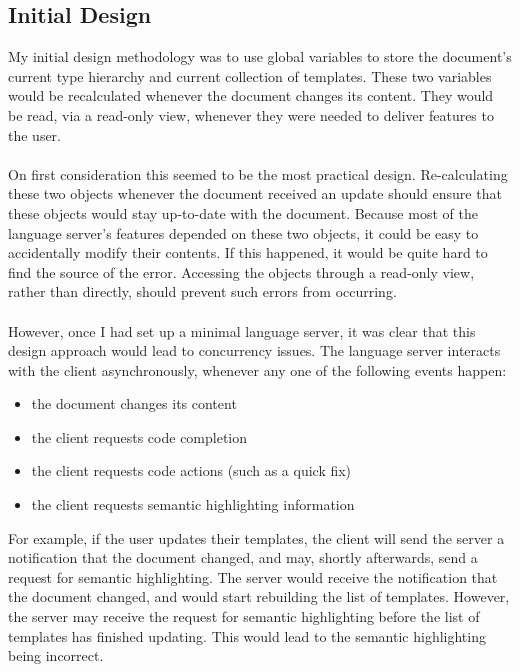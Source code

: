 \documentclass[../main.tex]{subfiles}
\begin{document}
\subsection{Initial Design}
My initial design methodology was to use global variables to store the document's current type hierarchy and current collection of templates. These two variables would be recalculated whenever the document changes its content. They would be read, via a read-only view, whenever they were needed to deliver features to the user.
\\
\\
On first consideration this seemed to be the most practical design. Re-calculating these two objects whenever the document received an update should ensure that these objects would stay up-to-date with the document. Because most of the language server's features depended on these two objects, it could be easy to accidentally modify their contents. If this happened, it would be quite hard to find the source of the error. Accessing the objects through a read-only view, rather than directly, should prevent such errors from occurring.
\\
\\
However, once I had set up a minimal language server, it was clear that this design approach would lead to concurrency issues. The language server interacts with the client asynchronously, whenever any one of the following events happen:
\begin{itemize}
    \item the document changes its content
    \item the client requests code completion
    \item the client requests code actions (such as a quick fix)
    \item the client requests semantic highlighting information
\end{itemize}
For example, if the user updates their templates, the client will send the server a notification that the document changed, and may, shortly afterwards, send a request for semantic highlighting. The server would receive the notification that the document changed, and would start rebuilding the list of templates. However, the server may receive the request for semantic highlighting before the list of templates has finished updating. This would lead to the semantic highlighting being incorrect.
\end{document}
